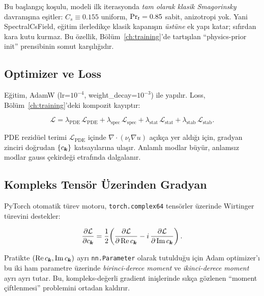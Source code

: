 Bu başlangıç koşulu, modeli ilk iterasyonda \emph{tam olarak klasik
Smagorinsky} davranışına eşitler: $C_s\equiv 0.155$ uniform, $\mathrm{Pr}_t=0.85$
sabit, anizotropi yok. Yani SpectralCsField, eğitim ilerledikçe
klasik kapanışın \emph{üstüne} ek yapı katar; sıfırdan kara kutu
kurmaz. Bu özellik, Bölüm~\ref{ch:training}'de tartışılan
``physics-prior init'' prensibinin somut karşılığıdır.

\subsection{Optimizer ve Loss}

Eğitim, AdamW (lr=$10^{-4}$, weight\_decay=$10^{-3}$) ile yapılır.
Loss, Bölüm~\ref{ch:training}'deki kompozit kayıptır:

\begin{equation}
  \mathcal{L} = \lambda_{\mathrm{PDE}}\,\mathcal{L}_{\mathrm{PDE}}
              + \lambda_{\mathrm{spec}}\,\mathcal{L}_{\mathrm{spec}}
              + \lambda_{\mathrm{stat}}\,\mathcal{L}_{\mathrm{stat}}
              + \lambda_{\mathrm{stab}}\,\mathcal{L}_{\mathrm{stab}}.
\end{equation}

PDE rezidüel terimi $\mathcal{L}_{\mathrm{PDE}}$ içinde $\nabla\!\cdot
(\nu_t\nabla u)$ açıkça yer aldığı için, gradyan zinciri doğrudan
$\{c_{\bm{k}}\}$ katsayılarına ulaşır. Anlamlı modlar büyür, anlamsız
modlar gauss çekirdeği etrafında dalgalanır.

\subsection{Kompleks Tensör Üzerinden Gradyan}

PyTorch otomatik türev motoru, \texttt{torch.complex64} tensörler
üzerinde Wirtinger türevini destekler:

\begin{equation}
  \frac{\partial \mathcal{L}}{\partial c_{\bm{k}}}
   = \frac{1}{2}\!\left(
     \frac{\partial\mathcal{L}}{\partial\,\mathrm{Re}\,c_{\bm{k}}}
     - i\,\frac{\partial\mathcal{L}}{\partial\,\mathrm{Im}\,c_{\bm{k}}}\right).
\end{equation}

Pratikte $(\mathrm{Re}\,c_{\bm{k}}, \mathrm{Im}\,c_{\bm{k}})$ ayrı
\texttt{nn.Parameter} olarak tutulduğu için Adam optimizer'ı bu iki
ham parametre üzerinde \emph{birinci-derece moment} ve \emph{ikinci-derece
moment} ayrı ayrı tutar. Bu, kompleks-değerli gradient inişlerinde
sıkça gözlenen ``moment çiftlenmesi'' problemini ortadan kaldırır.

